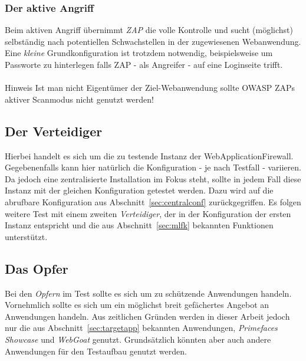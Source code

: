 \subsubsection{Der aktive Angriff}
Beim aktiven Angriff übernimmt \emph{ZAP} die volle Kontrolle und sucht (möglichst) selbständig nach potentiellen Schwachstellen in der zugewiesenen Webanwendung. Eine \emph{kleine} Grundkonfiguration ist trotzdem notwendig, beispielsweise um Passworte zu hinterlegen falls ZAP - als Angreifer - auf eine Loginseite trifft. \\\\
\textcolor{bhtGray}{ Hinweis} Ist man nicht Eigentümer der Ziel-Webanwendung sollte OWASP ZAPs aktiver Scanmodus nicht genutzt werden!\\


\subsection{Der Verteidiger}

Hierbei handelt es sich um die zu testende Instanz der WebApplicationFirewall. Gegebenenfalls kann hier natürlich die Konfiguration - je nach Testfall - variieren. Da jedoch eine zentralisierte Installation im Fokus steht, sollte in jedem Fall diese Instanz mit der gleichen Konfiguration getestet werden. Dazu wird auf die abrufbare Konfiguration aus Abschnitt~\ref{sec:centralconf} zurückgegriffen. Es folgen weitere Test mit einem zweiten \emph{Verteidiger}, der in der Konfiguration der ersten Instanz entspricht und die aus Abschnitt~\ref{sec:mlfk} bekannten Funktionen unterstützt. 

\subsection{Das Opfer}

Bei den \glqq\emph{Opfern}\grqq{} im Test sollte es sich um zu schützende Anwendungen handeln. Vornehmlich sollte es sich um ein möglichst breit gefächertes Angebot an Anwendungen handeln. Aus zeitlichen Gründen werden in dieser Arbeit jedoch nur die aus Abschnitt~\ref{sec:targetapp} bekannten Anwendungen, \emph{Primefaces Showcase} und \emph{WebGoat} genutzt. Grundsätzlich könnten aber auch andere Anwendungen für den Testaufbau genutzt werden.\\ 

